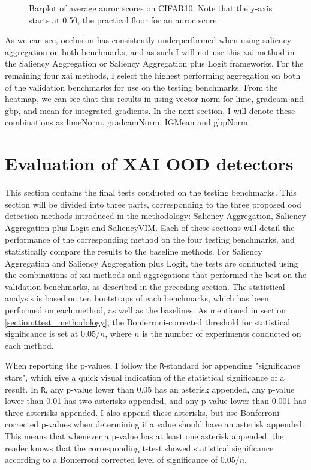 \documentclass[UKenglish]{uiomasterthesis} %
\theoremstyle{definition}
\begin{document}
\begin{figure}[H]
    \begin{center}
        
    \end{center}
    \caption[Average scores]{Barplot of average \ac{auroc} scores on CIFAR10. Note that the y-axis starts at 0.50, the practical floor for an \ac{auroc} score.}
    \label{fig:both_heatmap}
\end{figure}

As we can see, occlusion has consistently underperformed when using saliency aggregation on both benchmarks, and as such I will not use this \ac{xai} method in the Saliency Aggregation or Saliency Aggregation plus Logit frameworks. For the remaining four \ac{xai} methods, I select the highest performing aggregation on both of the validation benchmarks for use on the testing benchmarks. From the heatmap, we can see that this results in using vector norm for \ac{lime}, \ac{gradcam} and \ac{gbp}, and mean for integrated gradients. In the next section, I will denote these combinations as \ac{lime}Norm, \ac{gradcam}Norm, IGMean and \ac{gbp}Norm.

\section{Evaluation of XAI OOD detectors} \label{section:results}

This section contains the final tests conducted on the testing benchmarks. This section will be divided into three parts, corresponding to the three proposed \ac{ood} detection methods introduced in the methodology: Saliency Aggregation, Saliency Aggregation plus Logit and SaliencyVIM. Each of these sections will detail the performance of the corresponding method on the four testing benchmarks, and statistically compare the results to the baseline methods. For Saliency Aggregation and Saliency Aggregation plus Logit, the tests are conducted using the combinations of \ac{xai} methods and aggregations that performed the best on the validation benchmarks, as described in the preceding section. The statistical analysis is based on ten bootstraps of each benchmarks, which has been performed on each method, as well as the baselines. As mentioned in section \ref{section:ttest_methodology}, the Bonferroni-corrected threshold for statistical significance is set at $0.05 / n$, where $n$ is the number of experiments conducted on each method.

When reporting the p-values, I follow the \texttt{R}-standard for appending "significance stars", which give a quick visual indication of the statistical significance of a result. In \texttt{R}, any p-value lower than 0.05 has an asterisk appended, any p-value lower than 0.01 has two asterisks appended, and any p-value lower than 0.001 has three asterisks appended. I also append these asterisks, but use Bonferroni corrected p-values when determining if a value should have an asterisk appended. This means that whenever a p-value has at least one asterisk appended, the reader knows that the corresponding t-test showed statistical significance according to a Bonferroni corrected level of significance of $0.05 / n$.
\end{document}
